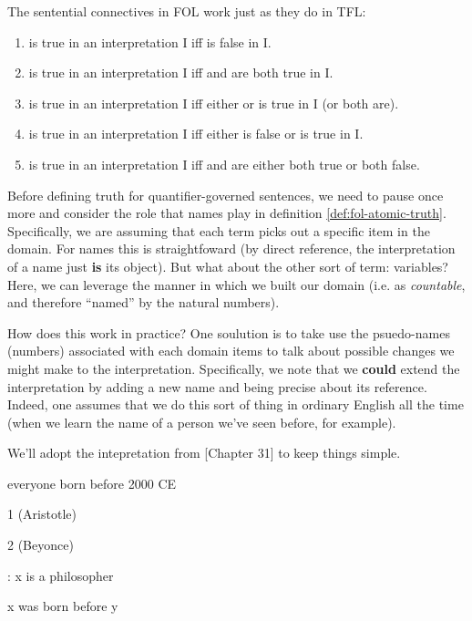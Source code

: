 \begin{definition}
  \label{def:fol-connective-truth}
  The sentential connectives in FOL work just as they do in TFL:\\
  \begin{enumerate}
  \item \enot\ephi is true in an interpretation I iff \ephi is false in I. 
  \item \ephi\eand\epsi is true in an interpretation I iff \ephi and \epsi
    are both true in I.
  \item \ephi\eand\epsi is true in an interpretation I iff either \ephi or
    \epsi is true in I (or both are).
  \item \ephi\eif\epsi is true in an interpretation I iff either \ephi is false
    or \epsi is true in I.
  \item \ephi\eiff\epsi is true in an interpretation I iff \ephi and \epsi are
    either both true or both false.
  \end{enumerate}  
\end{definition}

Before defining truth for quantifier-governed sentences, we need to pause once
more and consider the role that names play in definition
\ref{def:fol-atomic-truth}. Specifically, we are assuming that each term
picks out a specific item in the domain. For names this is straightfoward (by
direct reference, the interpretation of a name just \textbf{is} its object). But
what about the other sort of term: variables? Here, we can leverage the manner
in which we built our domain (i.e. as \emph{countable}, and therefore ``named''
by the natural numbers).

How does this work in practice? One soulution is to take use the psuedo-names
(numbers) associated with each domain items to talk about possible changes we
might make to the interpretation. Specifically, we note that we \textbf{could}
extend the interpretation by adding a new name and being precise about its
reference. Indeed, one assumes that we do this sort of thing in ordinary English
all the time (when we learn the name of a person we've seen before, for
example).

We'll adopt the intepretation from \cite{Mag25}[Chapter 31] to keep things
simple.

\begin{argument}
\item[\textbf{D:}] everyone born before 2000 CE
\item[a:] 1 (Aristotle)
\item[b:] 2 (Beyonce)
\item[P(x)]: x is a philosopher
\item[R(x,y):] x was born before y
\end{argument}


